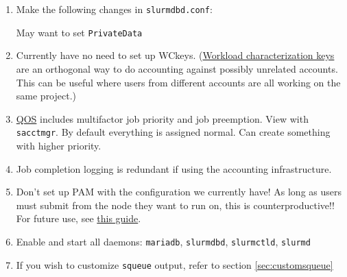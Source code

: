 \begin{enumerate}
  \item Make the following changes in \texttt{slurmdbd.conf}:

    May want to set \texttt{PrivateData}

  \item Currently have no need to set up WCkeys. (\href{https://slurm.schedmd.com/wckey.html}{Workload characterization keys} are an orthogonal way to do accounting against possibly unrelated accounts. This can be useful where users from different accounts are all working on the same project.)

  \item \href{https://slurm.schedmd.com/qos.html}{QOS} includes multifactor job priority and job preemption. View with \texttt{sacctmgr}. By default everything is assigned normal. Can create something with higher priority.

  \item Job completion logging is redundant if using the accounting infrastructure.

  \item Don't set up PAM with the configuration we currently have! As long as users must submit from the node they want to run on, this is counterproductive!! For future use, see \href{https://wiki.fysik.dtu.dk/niflheim/Slurm_configuration#pam-module-restrictions}{this guide}.

  \item Enable and start all daemons: \texttt{mariadb}, \texttt{slurmdbd}, \texttt{slurmctld}, \texttt{slurmd}

  \item If you wish to customize \texttt{squeue} output, refer to section \ref{sec:customsqueue}
\end{enumerate}



